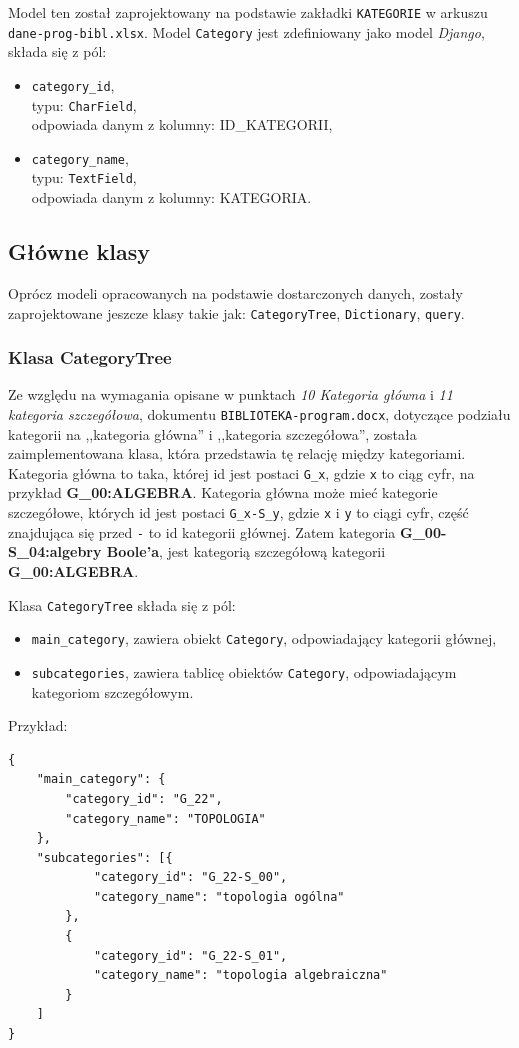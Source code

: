 \documentclass[twoside]{projektInzynierskiMS}
\begin{document}
Model ten został zaprojektowany na podstawie zakładki \verb`KATEGORIE` w arkuszu \verb`dane-prog-bibl.xlsx`.
Model \verb`Category` jest zdefiniowany jako model \textit{Django}, składa się z pól:

\begin{itemize}
	\item \verb`category_id`, \\
		typu: \verb`CharField`, \\
		odpowiada danym z kolumny: ID\_KATEGORII,
	\item \verb`category_name`, \\
	typu: \verb`TextField`, \\
	odpowiada danym z kolumny: KATEGORIA.
\end{itemize}

\subsection{Główne klasy}

Oprócz modeli opracowanych na podstawie dostarczonych danych, zostały zaprojektowane jeszcze klasy takie jak: \verb`CategoryTree`, \verb`Dictionary`, \verb`query`.

\subsubsection{Klasa CategoryTree}

Ze względu na wymagania opisane w punktach \textit{10 Kategoria główna} i \textit{11 kategoria szczegółowa}, dokumentu \verb`BIBLIOTEKA-program.docx`, dotyczące podziału kategorii na ,,kategoria główna'' i ,,kategoria szczegółowa'', została zaimplementowana klasa, która przedstawia tę relację między kategoriami. Kategoria główna to taka, której id jest postaci \verb`G_x`, gdzie \verb`x` to ciąg cyfr, na przykład \textbf{G\_00:ALGEBRA}.
 Kategoria główna może mieć kategorie szczegółowe, których id jest postaci \verb`G_x-S_y`, gdzie \verb`x` i \verb`y` to ciągi cyfr, część znajdująca się przed \verb`-` to id kategorii głównej. Zatem kategoria \textbf{G\_00-S\_04:algebry Boole’a}, jest kategorią szczegółową kategorii \textbf{G\_00:ALGEBRA}. 
 
Klasa \verb`CategoryTree` składa się z pól:
\begin{itemize}
	\item \verb`main_category`, 
		zawiera obiekt \verb`Category`,
		odpowiadający kategorii głównej,
	\item \verb`subcategories`, 
		zawiera tablicę obiektów \verb`Category`,
		odpowiadającym kategoriom szczegółowym.
\end{itemize}
Przykład:
\begin{verbatim}
{
    "main_category": {
        "category_id": "G_22",
        "category_name": "TOPOLOGIA"
    },
    "subcategories": [{
            "category_id": "G_22-S_00",
            "category_name": "topologia ogólna"
        },
        {
            "category_id": "G_22-S_01",
            "category_name": "topologia algebraiczna"
        }
    ]
}
\end{verbatim}
\end{document}
